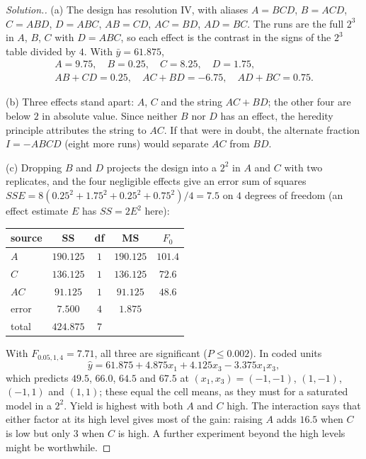 \documentclass[11pt,a4paper]{article}
\numberwithin{equation}{section}
\theoremstyle{definition}
\newenvironment{solution}
  {\renewcommand{\qedsymbol}{}\begin{proof}[\textit{Solution}.]}
  {\end{proof}}
\begin{document}
\begin{solution}
(a) The design has resolution IV, with aliases $A = BCD$, $B = ACD$, $C = ABD$, $D = ABC$, $AB = CD$, $AC = BD$, $AD = BC$. The runs are the full $2^3$ in $A$, $B$, $C$
with $D = ABC$, so each effect is the contrast in the signs of the $2^3$ table divided by $4$. With $\bar y = 61.875$,
\begin{gather*}
A = 9.75 , \quad B = 0.25 , \quad C = 8.25 , \quad D = 1.75 , \\
AB + CD = 0.25 , \quad AC + BD = -6.75 , \quad AD + BC = 0.75 .
\end{gather*}

(b) Three effects stand apart: $A$, $C$ and the string $AC + BD$; the other four are below $2$ in absolute value. Since neither $B$ nor $D$ has an effect, the
heredity principle attributes the string to $AC$. If that were in doubt, the alternate fraction $I = -ABCD$ (eight more runs) would separate $AC$ from $BD$.

(c) Dropping $B$ and $D$ projects the design into a $2^2$ in $A$ and $C$ with two replicates, and the four negligible effects give an error sum of squares
$SSE = 8(0.25^2 + 1.75^2 + 0.25^2 + 0.75^2)/4 = 7.5$ on $4$ degrees of freedom (an effect estimate $E$ has $SS = 2E^2$ here):
\begin{center}
\begin{tabular}{l|cccc}
source & SS & df & MS & $F_0$ \\
\hline
$A$ & $190.125$ & $1$ & $190.125$ & $101.4$ \\
$C$ & $136.125$ & $1$ & $136.125$ & $72.6$ \\
$AC$ & $91.125$ & $1$ & $91.125$ & $48.6$ \\
error & $7.500$ & $4$ & $1.875$ & \\
\hline
total & $424.875$ & $7$ & &
\end{tabular}
\end{center}
With $F_{0.05, 1, 4} = 7.71$, all three are significant ($P \le 0.002$). In coded units
\[
\hat y = 61.875 + 4.875x_1 + 4.125x_3 - 3.375x_1x_3 ,
\]
which predicts $49.5$, $66.0$, $64.5$ and $67.5$ at $(x_1, x_3) = (-1, -1)$, $(1, -1)$, $(-1, 1)$ and $(1, 1)$; these equal the cell means, as they must for a saturated
model in a $2^2$. Yield is highest with both $A$ and $C$ high. The interaction says that either factor at its high level gives most of the gain: raising
$A$ adds $16.5$ when $C$ is low but only $3$ when $C$ is high. A further experiment beyond the high levels might be worthwhile.
\end{solution}
\end{document}

